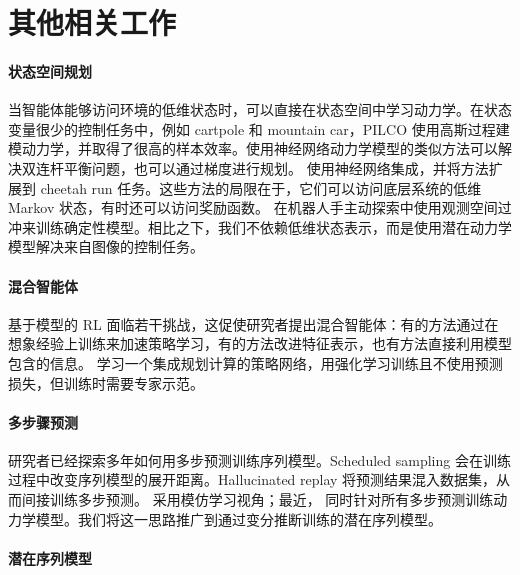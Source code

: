 \clearpage
\section{其他相关工作}
\label{sec:more_related_work}

\paragraph{状态空间规划}

当智能体能够访问环境的低维状态时，可以直接在状态空间中学习动力学。在状态变量很少的控制任务中，例如 cartpole 和 mountain car，PILCO \citep{deisenroth2011pilco} 使用高斯过程建模动力学，并取得了很高的样本效率。使用神经网络动力学模型的类似方法可以解决双连杆平衡问题\citep{gal2016deeppilco,higuera2018synthesizing}，也可以通过梯度进行规划\citep{henaff2018planbybackprop}。\citet{chua2018pets} 使用神经网络集成，并将方法扩展到 cheetah run 任务。这些方法的局限在于，它们可以访问底层系统的低维 Markov 状态，有时还可以访问奖励函数。\citet{amos2018awareness} 在机器人手主动探索中使用观测空间过冲来训练确定性模型。相比之下，我们不依赖低维状态表示，而是使用潜在动力学模型解决来自图像的控制任务。

\paragraph{混合智能体}

基于模型的 RL 面临若干挑战，这促使研究者提出混合智能体：有的方法通过在想象经验上训练来加速策略学习\citep{kalweit2017blending,nagabandi2017mbmf,kurutach2018modeltrpo,buckman2018steve,ha2018worldmodels}，有的方法改进特征表示\citep{wayne2018merlin,igl2018dvrl}，也有方法直接利用模型包含的信息\citep{weber2017i2a}。\citet{srinivas2018upn} 学习一个集成规划计算的策略网络，用强化学习训练且不使用预测损失，但训练时需要专家示范。

\paragraph{多步骤预测}

研究者已经探索多年如何用多步预测训练序列模型。Scheduled sampling \citep{bengio2015scheduled} 会在训练过程中改变序列模型的展开距离。Hallucinated replay \citep{talvitie2014hallucinated} 将预测结果混入数据集，从而间接训练多步预测。\citet{venkatraman2015dad} 采用模仿学习视角；最近，\citet{amos2018awareness} 同时针对所有多步预测训练动力学模型。我们将这一思路推广到通过变分推断训练的潜在序列模型。

\paragraph{潜在序列模型}

